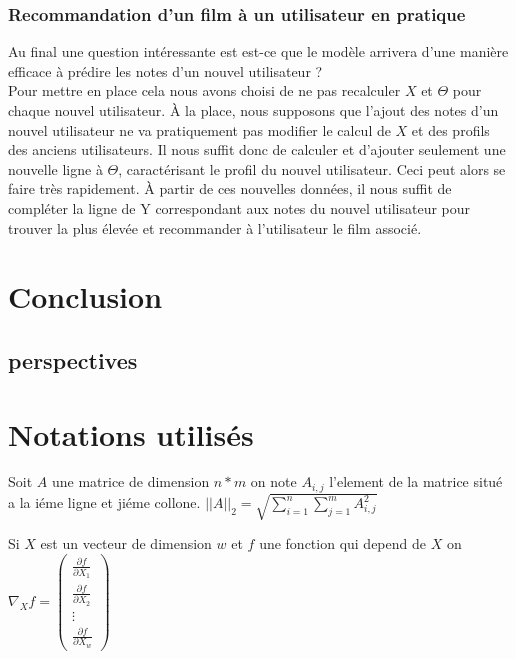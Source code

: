 \documentclass[a4paper,10pt]{article}
\begin{document}
\subsubsection{Recommandation d'un film à un utilisateur en pratique}
Au final une question intéressante est est-ce que le modèle arrivera d'une manière efficace à prédire les notes d'un nouvel utilisateur ?\\

Pour mettre en place cela nous avons choisi de ne pas recalculer $X$ et $\Theta$ pour chaque nouvel utilisateur. À la place, nous supposons que l'ajout des notes d'un nouvel utilisateur ne va pratiquement pas modifier le calcul de $X$ et des profils des anciens utilisateurs. Il nous suffit donc de calculer et d'ajouter seulement une nouvelle ligne à $\Theta$, caractérisant le profil du nouvel utilisateur. Ceci peut alors se faire très rapidement. À partir de ces nouvelles données, il nous suffit de compléter la ligne de Y correspondant aux notes du nouvel utilisateur pour trouver la plus élevée et recommander à l'utilisateur le film associé.

\section{Conclusion}

\subsection{perspectives}
\appendix
\section{Notations utilisés}
Soit $A$ une matrice de dimension $n*m$ on note $A_{i, j}$ l'element de la matrice situé a la iéme ligne et jiéme collone.
$||A||_{2} = \sqrt{\sum_{i = 1}^{n}\sum_{j = 1}^{m} A_{i, j}^{2}}$


Si $X$ est un vecteur de dimension $w$ et $f$ une fonction qui depend de $X$ %
on $\nabla_{X} f =
\begin{pmatrix}
\frac{\partial f}{\partial X_{1}}\\
\frac{\partial f}{\partial X_{2}}\\
\vdots\\
\frac{\partial f}{\partial X_{w}}
\end{pmatrix}$ 
\end{document}
